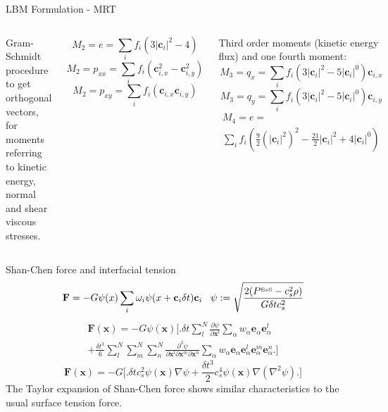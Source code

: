 \documentclass{beamer}
\begin{document}
	\begin{frame}{LBM Formulation - MRT}
		
		\begin{columns}
		Gram-Schmidt procedure to get orthogonal vectors, for moments referring to kinetic energy, normal and shear viscous stresses.
		
		\begin{equation*}
			M_2 = e = \sum_i f_i (3 |\mathbf{c}_i|^2-4)
		\end{equation*}
		\begin{equation*}
			M_2 = p_{xx} = \sum_i f_i (\mathbf{c}_{i,x}^2 - \mathbf{c}_{i,y}^2)
		\end{equation*}
		\begin{equation*}
			M_2 = p_{xy} = \sum_i f_i (\mathbf{c}_{i,x}  \mathbf{c}_{i,y})
		\end{equation*}
		
		Third order moments (kinetic energy flux) and one fourth moment:
		\begin{equation*}
		M_3 = q_x = \sum_i f_i (3 |\mathbf{c}_i|^2-5|\mathbf{c}_i|^0) \mathbf{c}_{i,x}
		\end{equation*}
		\begin{equation*}
		M_3 = q_y = \sum_i f_i (3 |\mathbf{c}_i|^2-5|\mathbf{c}_i|^0) \mathbf{c}_{i,y}
		\end{equation*}
		\begin{multline*}
		M_4 = e = \\
		\sum_i f_i (\frac{9}{2} (|\mathbf{c}_i|^2) ^2- \frac{21}{2}|\mathbf{c}_i|^2+ 4 |\mathbf{c}_i|^0)
		\end{multline*}
	\end{columns}
	\end{frame}

	\begin{frame}{Shan-Chen force and interfacial tension}
		\begin{equation*}
		\mathbf{F} = -G \psi(x) \sum_i \omega_i \psi(x+\mathbf{c}_i \delta t) \mathbf{c}_i \, \, \, \, \, \psi := \sqrt{\frac{2(P^{\text{\tiny EoS}}-c_s^2\rho)}{G \delta t c_s^2}}
		\end{equation*}
		\begin{multline*}
		\mathbf{F}(\mathbf{x}) = -G \psi (\mathbf{x}) \big[ \big.  \delta t \sum_{l}^{N} \frac{\partial \psi}{\partial \mathbf{x}^l} \sum_\alpha w_\alpha \mathbf{e}_\alpha \mathbf{e}_\alpha^l \\ + \frac{\delta t^3}{6} \sum_{l}^{N} \sum_{m}^{N} \sum_{n}^{N} \frac{\partial^3 \psi}{\partial \mathbf{x}^l \partial \mathbf{x}^m \partial \mathbf{x}^n} \sum_\alpha w_\alpha \mathbf{e}_\alpha \mathbf{e}_\alpha^l \mathbf{e}_\alpha^m \mathbf{e}_\alpha^n  \big. \big]
		\end{multline*}
		\begin{equation*}
		\mathbf{F}(\mathbf{x}) = -G \big[ \big.  \delta t c^2_s   \psi (\mathbf{x}) \nabla \psi + \frac{\delta t^3}{2} c^4_s \psi (\mathbf{x}) \nabla (\nabla^2\psi)  \big. \big]
		\end{equation*}
		The Taylor expansion of Shan-Chen force shows similar characteristics to the usual surface tension force.
	\end{frame}
\end{document}
